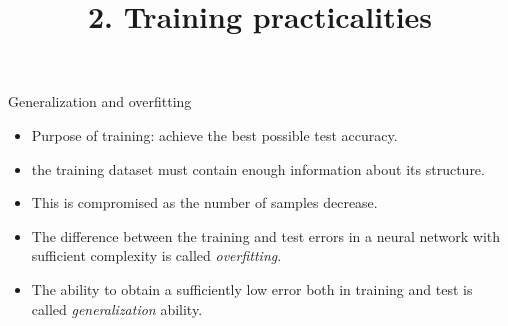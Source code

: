 \documentclass{beamer}
\title{2. Training practicalities}
\subtitle{}
\begin{document}
\maketitle

\begin{frame}{Generalization and overfitting}
\begin{itemize}
    \item Purpose of training:  achieve the best possible test accuracy. 
    \item the training dataset must contain enough information about its structure.\item This is compromised as the number of samples decrease. 
    \item The difference between the training and test errors in a neural network with sufficient complexity is called \emph{overfitting}. 
    \item The ability to obtain a sufficiently low error both in training and test is called \emph{generalization} ability.   
\end{itemize}
\end{frame}
\end{document}
